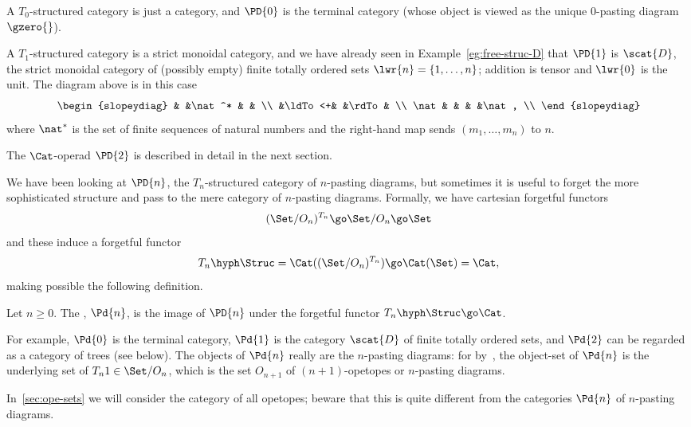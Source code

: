 A $T_0$-structured category is just a category, and $\PD{0}$ is the
terminal category (whose object is viewed as the unique 0-pasting diagram
$\gzero{}$).  

A $T_1$-structured category is a strict monoidal category, and we have
already seen in Example~\ref{eg:free-struc-D} that $\PD{1}$ is $\scat{D}$,%
%
%
the strict monoidal category of (possibly empty) finite totally ordered
sets $\lwr{n} = \{1, \ldots, n\}$; addition is tensor and $\lwr{0}$ is the
unit.  The diagram above is in this case
\[
\begin{slopeydiag}
	&	&\nat^*		&	&	\\
	&\ldTo<+&		&\rdTo	&	\\
\nat	&	&		&	&\nat,	\\
\end{slopeydiag}
\]
where $\nat^*$ is the set of finite sequences of natural numbers and the
right-hand map sends $(m_1, \ldots, m_n)$ to $n$.  

The $\Cat$-operad $\PD{2}$ is described in detail in the next section.

We have been looking at $\PD{n}$, the $T_n$-structured category of
$n$-pasting diagrams, but sometimes it is useful to forget the more
sophisticated structure and pass to the mere category of $n$-pasting
diagrams.  Formally, we have cartesian forgetful functors
\[
(\Set/O_n)^{T_n} \go \Set/O_n \go \Set
\]
and these induce a forgetful functor
\[
T_n \hyph \Struc = \Cat((\Set/O_n)^{T_n})
\go
\Cat(\Set) = \Cat,
\]
making possible the following definition.
%
\begin{defn}
Let $n\geq 0$.  The , $\Pd{n}$,%
% 
% 
is
the image of $\PD{n}$ under the forgetful functor $T_n\hyph\Struc \go
\Cat$.  
\end{defn}
%
For example, $\Pd{0}$ is the terminal category, $\Pd{1}$ is the category
$\scat{D}$ of finite totally ordered sets, and $\Pd{2}$ can be regarded as
a category of trees (see below).  The objects of $\Pd{n}$ really
are the $n$-pasting diagrams: for by~, the object-set of
$\Pd{n}$ is the underlying set of $T_n 1 \in \Set/O_n$, which is the set
$O_{n+1}$ of $(n+1)$-opetopes or $n$-pasting diagrams.

In~\ref{sec:ope-sets} we will consider the category of all opetopes;%
%
%
beware
that this is quite different from the categories $\Pd{n}$ of $n$-pasting
diagrams.

